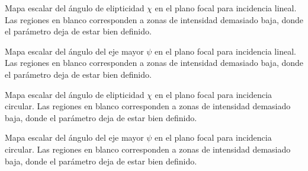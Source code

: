 \caption{Mapa escalar del ángulo de elipticidad $\chi$ en el plano focal para incidencia lineal. Las regiones en blanco corresponden a zonas de intensidad demasiado baja, donde el parámetro deja de estar bien definido.}
\label{fig:lineal-plano-focal-elipticidad}

\caption{Mapa escalar del ángulo del eje mayor $\psi$ en el plano focal para incidencia lineal. Las regiones en blanco corresponden a zonas de intensidad demasiado baja, donde el parámetro deja de estar bien definido.}
\label{fig:lineal-plano-focal-psi}

\caption{Mapa escalar del ángulo de elipticidad $\chi$ en el plano focal para incidencia circular. Las regiones en blanco corresponden a zonas de intensidad demasiado baja, donde el parámetro deja de estar bien definido.}
\label{fig:circular-plano-focal-elipticidad}

\caption{Mapa escalar del ángulo del eje mayor $\psi$ en el plano focal para incidencia circular. Las regiones en blanco corresponden a zonas de intensidad demasiado baja, donde el parámetro deja de estar bien definido.}
\label{fig:circular-plano-focal-psi}
